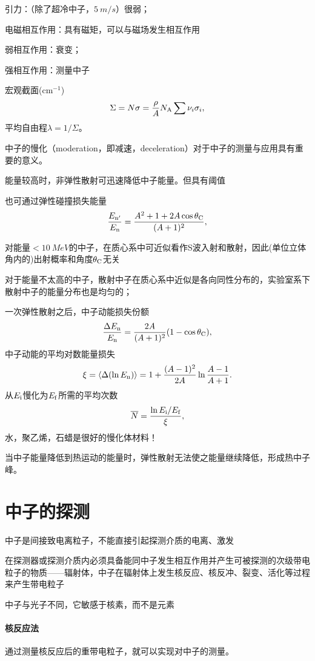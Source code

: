 \begin{compactitem}
	\item 引力：（除了超冷中子，$\SI{5}{m/s}$）很弱；
	\item 电磁相互作用：具有磁矩，可以与磁场发生相互作用
	\item 弱相互作用：衰变；
	\item 强相互作用：测量中子
\end{compactitem}
宏观截面(cm$^{-1}$)
\[
	\Sigma=N\sigma=\frac\rho{A}N_{\mathrm A}\sum\nu_i\sigma_i,
\]
平均自由程$\lambda=1/\Sigma$。

中子的慢化（moderation，即减速，deceleration）对于中子的测量与应用具有重要的意义。
\begin{compactitem}
	\item 能量较高时，非弹性散射可迅速降低中子能量。但具有阈值
	\item 也可通过弹性碰撞损失能量
	\[
		\frac{E_{\mathrm n'}}{E_\mathrm n}=\frac{A^2+1+2A\cos\theta_{\mathrm C}}{(A+1)^2},
	\]
\end{compactitem}
对能量$<\SI{10}{MeV}$的中子，在质心系中可近似看作S波入射和散射，因此(单位立体角内的)出射概率和角度$\theta_{\mathrm C}$无关

对于能量不太高的中子，散射中子在质心系中近似是各向同性分布的，实验室系下散射中子的能量分布也是均匀的；

一次弹性散射之后，中子动能损失份额
\[
	\frac{\Delta E_\mathrm n}{E_\mathrm n}=\frac{2A}{(A+1)^2}(1-\cos\theta_{\mathrm C}),
\]
中子动能的平均对数能量损失
\[
	\xi=\left\langle \Delta(\ln E_\mathrm n)\right\rangle=1+\frac{(A-1)^2}{2A}\ln\frac{A-1}{A+1}.
\]
从$E_{\mathrm{i}}$慢化为$E_{\mathrm{f}}$所需的平均次数
\[
	\overline{N}=\frac{\ln E_{\mathrm{i}}/E_{\mathrm{f}}}{\xi},
\]
水，聚乙烯，石蜡是很好的慢化体材料！

当中子能量降低到热运动的能量时，弹性散射无法使之能量继续降低，形成热中子峰。

\section{中子的探测}

中子是间接致电离粒子，不能直接引起探测介质的电离、激发

在探测器或探测介质内必须具备能同中子发生相互作用并产生可被探测的次级带电粒子的物质——辐射体，中子在辐射体上发生核反应、核反冲、裂变、活化等过程来产生带电粒子

中子与光子不同，它敏感于核素，而不是元素
\paragraph{核反应法}通过测量核反应后的重带电粒子，就可以实现对中子的测量。

